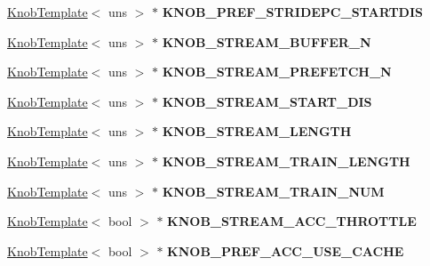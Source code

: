 \begin{DoxyCompactItemize}
\item 
\hypertarget{classall__knobs__c_a38b1a5c5fec8e730bc17bec72d3e9109}{
\hyperlink{classKnobTemplate}{KnobTemplate}$<$ uns $>$ $\ast$ {\bfseries KNOB\_\-PREF\_\-STRIDEPC\_\-STARTDIS}}
\label{classall__knobs__c_a38b1a5c5fec8e730bc17bec72d3e9109}

\item 
\hypertarget{classall__knobs__c_a0d028791f2202c8b83751d407346cbb2}{
\hyperlink{classKnobTemplate}{KnobTemplate}$<$ uns $>$ $\ast$ {\bfseries KNOB\_\-STREAM\_\-BUFFER\_\-N}}
\label{classall__knobs__c_a0d028791f2202c8b83751d407346cbb2}

\item 
\hypertarget{classall__knobs__c_a60472a782d492d7229029e60be199251}{
\hyperlink{classKnobTemplate}{KnobTemplate}$<$ uns $>$ $\ast$ {\bfseries KNOB\_\-STREAM\_\-PREFETCH\_\-N}}
\label{classall__knobs__c_a60472a782d492d7229029e60be199251}

\item 
\hypertarget{classall__knobs__c_aa2276bee19ffbe8d905972317dd59584}{
\hyperlink{classKnobTemplate}{KnobTemplate}$<$ uns $>$ $\ast$ {\bfseries KNOB\_\-STREAM\_\-START\_\-DIS}}
\label{classall__knobs__c_aa2276bee19ffbe8d905972317dd59584}

\item 
\hypertarget{classall__knobs__c_a0dac44403cdcddc204e37abe61f05fe0}{
\hyperlink{classKnobTemplate}{KnobTemplate}$<$ uns $>$ $\ast$ {\bfseries KNOB\_\-STREAM\_\-LENGTH}}
\label{classall__knobs__c_a0dac44403cdcddc204e37abe61f05fe0}

\item 
\hypertarget{classall__knobs__c_a4f6d9caa2cc8d8884bc6f6290fb95cf1}{
\hyperlink{classKnobTemplate}{KnobTemplate}$<$ uns $>$ $\ast$ {\bfseries KNOB\_\-STREAM\_\-TRAIN\_\-LENGTH}}
\label{classall__knobs__c_a4f6d9caa2cc8d8884bc6f6290fb95cf1}

\item 
\hypertarget{classall__knobs__c_ab461a1252107cb8435ecc48800f118f9}{
\hyperlink{classKnobTemplate}{KnobTemplate}$<$ uns $>$ $\ast$ {\bfseries KNOB\_\-STREAM\_\-TRAIN\_\-NUM}}
\label{classall__knobs__c_ab461a1252107cb8435ecc48800f118f9}

\item 
\hypertarget{classall__knobs__c_ae92d4317171625ee3f119b1d1270bf92}{
\hyperlink{classKnobTemplate}{KnobTemplate}$<$ bool $>$ $\ast$ {\bfseries KNOB\_\-STREAM\_\-ACC\_\-THROTTLE}}
\label{classall__knobs__c_ae92d4317171625ee3f119b1d1270bf92}

\item 
\hypertarget{classall__knobs__c_a90d5e4abc8406d400a424698a6eab655}{
\hyperlink{classKnobTemplate}{KnobTemplate}$<$ bool $>$ $\ast$ {\bfseries KNOB\_\-PREF\_\-ACC\_\-USE\_\-CACHE}}
\label{classall__knobs__c_a90d5e4abc8406d400a424698a6eab655}


\end{DoxyCompactItemize}
